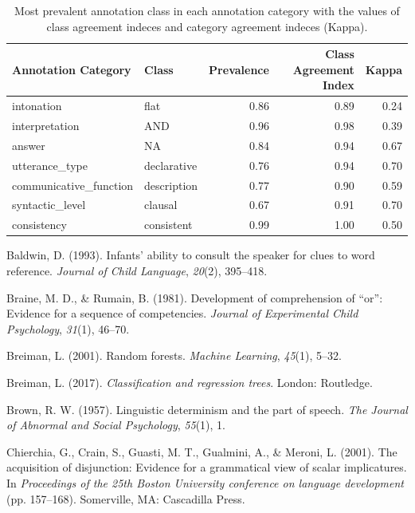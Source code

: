 \documentclass[,man,floatsintext]{apa6}
\begin{document}
\begin{table}

\caption{\label{tab:andAgreeStats}Most prevalent annotation class in each annotation category with the values of class agreement indeces and category agreement indeces (Kappa).}
\centering
\begin{tabular}[t]{l|l|r|r|r}
\hline
Annotation Category & Class & Prevalence & Class Agreement Index & Kappa\\
\hline
intonation & flat & 0.86 & 0.89 & 0.24\\
\hline
interpretation & AND & 0.96 & 0.98 & 0.39\\
\hline
answer & NA & 0.84 & 0.94 & 0.67\\
\hline
utterance\_type & declarative & 0.76 & 0.94 & 0.70\\
\hline
communicative\_function & description & 0.77 & 0.90 & 0.59\\
\hline
syntactic\_level & clausal & 0.67 & 0.91 & 0.70\\
\hline
consistency & consistent & 0.99 & 1.00 & 0.50\\
\hline
\end{tabular}
\end{table}

\setlength{\parindent}{-0.5in}
\setlength{\leftskip}{0.5in}

\hypertarget{refs}{}
\leavevmode\hypertarget{ref-baldwin1993infants}{}%
Baldwin, D. (1993). Infants' ability to consult the speaker for clues to word reference. \emph{Journal of Child Language}, \emph{20}(2), 395--418.

\leavevmode\hypertarget{ref-braine1981development}{}%
Braine, M. D., \& Rumain, B. (1981). Development of comprehension of ``or'': Evidence for a sequence of competencies. \emph{Journal of Experimental Child Psychology}, \emph{31}(1), 46--70.

\leavevmode\hypertarget{ref-breiman2001random}{}%
Breiman, L. (2001). Random forests. \emph{Machine Learning}, \emph{45}(1), 5--32.

\leavevmode\hypertarget{ref-breiman2017classification}{}%
Breiman, L. (2017). \emph{Classification and regression trees}. London: Routledge.

\leavevmode\hypertarget{ref-brown1957linguistic}{}%
Brown, R. W. (1957). Linguistic determinism and the part of speech. \emph{The Journal of Abnormal and Social Psychology}, \emph{55}(1), 1.

\leavevmode\hypertarget{ref-chierchia2001acquisition}{}%
Chierchia, G., Crain, S., Guasti, M. T., Gualmini, A., \& Meroni, L. (2001). The acquisition of disjunction: Evidence for a grammatical view of scalar implicatures. In \emph{Proceedings of the 25th Boston University conference on language development} (pp. 157--168). Somerville, MA: Cascadilla Press.
\end{document}
